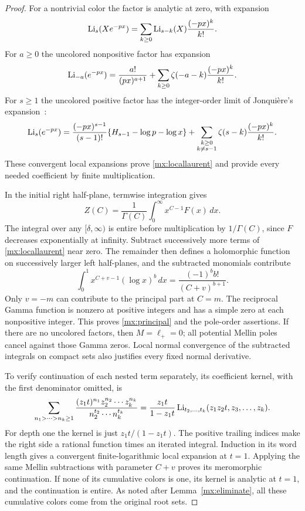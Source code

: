 \documentclass[11pt]{article}
\numberwithin{equation}{section}
\theoremstyle{definition}
\theoremstyle{remark}
\begin{document}
\begin{proof}
For a nontrivial color the factor is analytic at zero, with expansion
\begin{equation}\label{mx:nontrivexp}
 \operatorname{Li}_s(Xe^{-px})
   =\sum_{k\geq0}\operatorname{Li}_{s-k}(X)\frac{(-px)^k}{k!}.
\end{equation}
For $a\geq0$ the uncolored nonpositive factor has expansion
\begin{equation}\label{mx:negativeexp}
 \operatorname{Li}_{-a}(e^{-px})
   =\frac{a!}{(px)^{a+1}}
      +\sum_{k\geq0}\zeta(-a-k)\frac{(-px)^k}{k!}.
\end{equation}
For $s\geq1$ the uncolored positive factor has the integer-order
limit of Jonqui\`ere's expansion~\cite[Eq.~25.12.12]{DLMFpolylog}:
\begin{equation}\label{mx:positiveexp}
 \operatorname{Li}_s(e^{-px})
  =\frac{(-px)^{s-1}}{(s-1)!}
       \{H_{s-1}-\log p-\log x\}
    +\sum_{\substack{k\geq0\\k\ne s-1}}
       \zeta(s-k)\frac{(-px)^k}{k!}.
\end{equation}
These convergent local expansions prove \eqref{mx:locallaurent} and
provide every needed coefficient by finite multiplication.

In the initial right half-plane, termwise integration gives
\begin{equation}\label{mx:mellin}
 Z(C)=\frac1{\Gamma(C)}\int_0^\infty x^{C-1}F(x)\,dx.
\end{equation}
The integral over any $[\delta,\infty)$ is entire before multiplication
by $1/\Gamma(C)$, since $F$ decreases exponentially at infinity.
Subtract successively more terms of \eqref{mx:locallaurent} near zero.
The remainder then defines a holomorphic function on successively
larger left half-planes, and the subtracted monomials contribute
\[
 \int_0^1x^{C+v-1}(\log x)^b\,dx
       =\frac{(-1)^bb!}{(C+v)^{b+1}}.
\]
Only $v=-m$ can contribute to the principal part at $C=m$.
The reciprocal Gamma function is nonzero at positive integers and
has a simple zero at each nonpositive integer.  This proves
\eqref{mx:principal} and the pole-order assertions.  If there are no
uncolored factors, then $M=\ell_+=0$; all potential Mellin poles cancel
against those Gamma zeros.  Local normal convergence of the subtracted
integrals on compact sets also justifies every fixed normal
derivative.

To verify continuation of each nested term separately, its coefficient
kernel, with the first denominator omitted, is
\[
 \sum_{n_1>\cdots>n_k\geq1}
 \frac{(z_1t)^{n_1}z_2^{n_2}\cdots z_k^{n_k}}
      {n_2^{t_2}\cdots n_k^{t_k}}
 =\frac{z_1t}{1-z_1t}
     \operatorname{Li}_{t_2,\ldots,t_k}(z_1z_2t,z_3,\ldots,z_k).
\]
For depth one the kernel is just $z_1t/(1-z_1t)$.  The positive
trailing indices make the right side a rational function times an
iterated integral.  Induction in its word length gives a convergent
finite-logarithmic local expansion at $t=1$.  Applying the same Mellin
subtractions with parameter $C+v$ proves its meromorphic continuation.
If none of its cumulative colors is one, its kernel is analytic at
$t=1$, and the continuation is entire.  As noted after
Lemma~\ref{mx:eliminate}, all these cumulative colors come from the
original root sets.
\end{proof}
\end{document}
